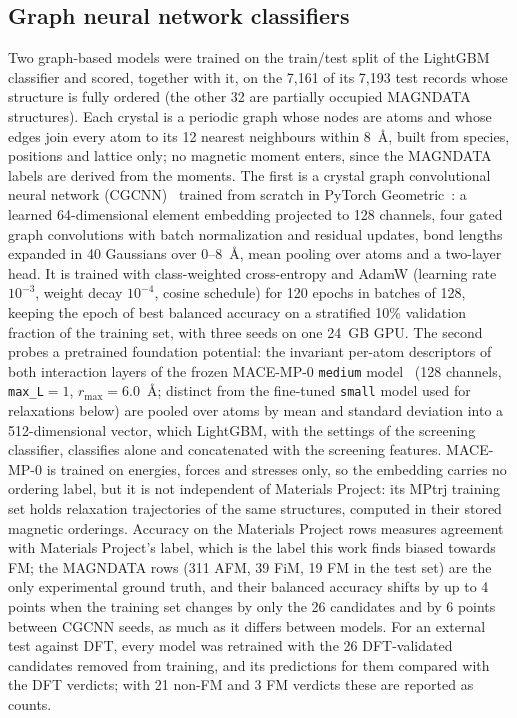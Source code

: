 \documentclass[aps,prb,preprint,superscriptaddress,longbibliography,nofootinbib]{revtex4-2}
\begin{document}
\subsection*{Graph neural network classifiers}

Two graph-based models were trained on the train/test split of the LightGBM classifier and scored, together with
it, on the 7{,}161 of its 7{,}193 test records whose structure is fully ordered (the other 32 are partially
occupied MAGNDATA structures). Each crystal is a periodic graph whose nodes are atoms and whose edges join every
atom to its 12 nearest neighbours within 8~\AA, built from species, positions and lattice only; no magnetic
moment enters, since the MAGNDATA labels are derived from the moments. The first is a crystal graph
convolutional neural network (CGCNN)~\cite{xie2018} trained from scratch in PyTorch Geometric~\cite{fey2019}: a
learned 64-dimensional element embedding projected to 128 channels, four gated graph convolutions with batch
normalization and residual updates, bond lengths expanded in 40 Gaussians over 0--8~\AA, mean pooling over atoms
and a two-layer head. It is trained with class-weighted cross-entropy and AdamW (learning rate $10^{-3}$, weight
decay $10^{-4}$, cosine schedule) for 120 epochs in batches of 128, keeping the epoch of best balanced accuracy on
a stratified 10\% validation fraction of the training set, with three seeds on one 24~GB GPU. The second probes a
pretrained foundation potential: the invariant per-atom descriptors of both interaction layers of the frozen
MACE-MP-0 \texttt{medium} model~\cite{batatia2023} (128 channels, \texttt{max\_L}$=1$, $r_\mathrm{max}=6.0$~\AA;
distinct from the fine-tuned \texttt{small} model used for relaxations below) are pooled over atoms by mean and
standard deviation into a 512-dimensional vector, which LightGBM, with the settings of the screening classifier,
classifies alone and concatenated with the screening features. MACE-MP-0 is trained on energies, forces and
stresses only, so the embedding carries no ordering label, but it is not independent of Materials Project: its
MPtrj training set holds relaxation trajectories of the same structures, computed in their stored magnetic
orderings. Accuracy on the Materials Project rows measures agreement with Materials Project's label, which is
the label this work finds biased towards FM; the MAGNDATA rows (311 AFM, 39 FiM, 19 FM in the test set) are the
only experimental ground truth, and their balanced accuracy shifts by up to 4 points when the training set changes by
only the 26 candidates and by 6 points between CGCNN seeds, as much as it differs between models. For an external test against DFT, every model was
retrained with the 26 DFT-validated candidates removed from training, and its predictions for them compared with
the DFT verdicts; with 21 non-FM and 3 FM verdicts these are reported as counts.
\end{document}

